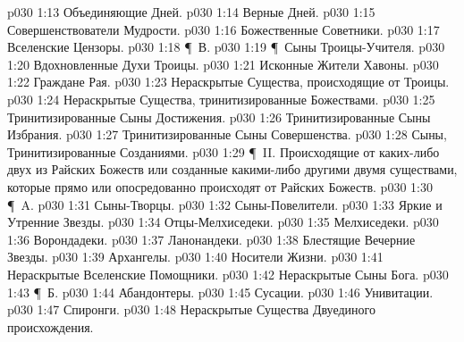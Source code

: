\vs p030 1:13 \bibnobreakspace Объединяющие Дней.
\vs p030 1:14 \bibnobreakspace Верные Дней.
\vs p030 1:15 \bibnobreakspace Совершенствователи Мудрости.
\vs p030 1:16 \bibnobreakspace Божественные Советники.
\vs p030 1:17 \bibnobreakspace Вселенские Цензоры.
\vs p030 1:18 \P\ В. 
\vs p030 1:19 \P\ \bibnobreakspace Сыны Троицы\hyp{}Учителя.
\vs p030 1:20 \bibnobreakspace Вдохновленные Духи Троицы.
\vs p030 1:21 \bibnobreakspace Исконные Жители Хавоны.
\vs p030 1:22 \bibnobreakspace Граждане Рая.
\vs p030 1:23 \bibnobreakspace Нераскрытые Существа, происходящие от Троицы.
\vs p030 1:24 \bibnobreakspace Нераскрытые Существа, тринитизированные Божествами.
\vs p030 1:25 \bibnobreakspace Тринитизированные Сыны Достижения.
\vs p030 1:26 \bibnobreakspace Тринитизированные Сыны Избрания.
\vs p030 1:27 \bibnobreakspace Тринитизированные Сыны Совершенства.
\vs p030 1:28 \bibnobreakspace Сыны, Тринитизированные Созданиями.
\vs p030 1:29 \P\ II.  Происходящие от каких\hyp{}либо двух из Райских Божеств или созданные какими\hyp{}либо другими двумя существами, которые прямо или опосредованно происходят от Райских Божеств.
\vs p030 1:30 \P\ A. 
\vs p030 1:31 \bibnobreakspace Сыны\hyp{}Творцы.
\vs p030 1:32 \bibnobreakspace Сыны\hyp{}Повелители.
\vs p030 1:33 \bibnobreakspace Яркие и Утренние Звезды.
\vs p030 1:34 \bibnobreakspace Отцы\hyp{}Мелхиседеки.
\vs p030 1:35 \bibnobreakspace Мелхиседеки.
\vs p030 1:36 \bibnobreakspace Ворондадеки.
\vs p030 1:37 \bibnobreakspace Ланонандеки.
\vs p030 1:38 \bibnobreakspace Блестящие Вечерние Звезды.
\vs p030 1:39 \bibnobreakspace Архангелы.
\vs p030 1:40 \bibnobreakspace Носители Жизни.
\vs p030 1:41 \bibnobreakspace Нераскрытые Вселенские Помощники.
\vs p030 1:42 \bibnobreakspace Нераскрытые Сыны Бога.
\vs p030 1:43 \P\ Б. 
\vs p030 1:44 \bibnobreakspace Абандонтеры.
\vs p030 1:45 \bibnobreakspace Сусации.
\vs p030 1:46 \bibnobreakspace Унивитации.
\vs p030 1:47 \bibnobreakspace Спиронги.
\vs p030 1:48 \bibnobreakspace Нераскрытые Существа Двуединого происхождения.
